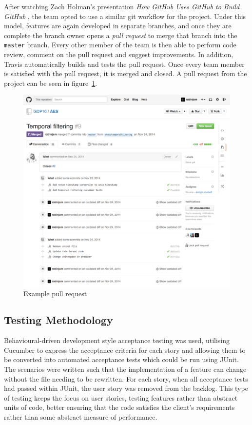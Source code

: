 \documentclass[a4paper, 12pt, twoside]{article}
\begin{document}
After watching Zach Holman's presentation \emph{How GitHub Uses GitHub to Build GitHub} \cite{hgugtbg}, the team opted to use a similar git workflow for the project. Under this model, features are again developed in separate branches, and once they are complete the branch owner opens a \emph{pull request} to merge that branch into the \texttt{master} branch. Every other member of the team is then able to perform code review, comment on the pull request and suggest improvements. In addition, Travis automatically builds and tests the pull request. Once every team member is satisfied with the pull request, it is merged and closed. A pull request from the project can be seen in figure~\ref{fig:pull_request}.

\begin{figure}
  \includegraphics[width=\linewidth]{pull_request.png}
  \caption{Example pull request}
  \label{fig:pull_request}
\end{figure}

\subsection{Testing Methodology}
\label{sec:plan_testing_methodology}

Behavioural-driven development style acceptance testing was used, utilising Cucumber to express the acceptance criteria for each story and allowing them to be converted into automated acceptance tests which could be run using JUnit. The scenarios were written such that the implementation of a feature can change without the file needing to be rewritten. For each story, when all acceptance tests had passed within JUnit, the user story was removed from the backlog. This type of testing keeps the focus on user stories, testing features rather than abstract units of code, better ensuring that the code satisfies the client's requirements rather than some abstract measure of performance.
\end{document}

